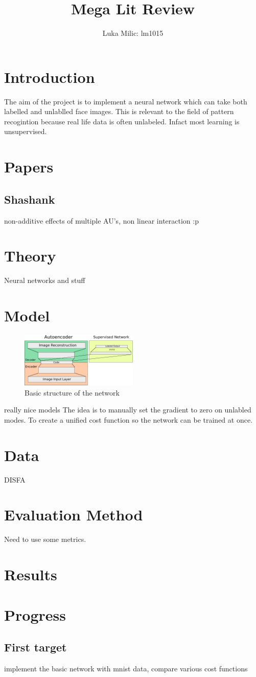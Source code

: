 \documentclass[11pt]{article}
\title{Mega Lit Review}
\author{Luka Milic: lm1015}
\begin{document}
\maketitle
\section{Introduction}
The aim of the project is to implement a neural network which can take both labelled and unlablled face images. \cite{tensorflow2015-whitepaper}
This is relevant to the field of pattern recogintion because real life data is often unlabeled. Infact most learning is unsupervised.
\section{Papers}
\subsection{Shashank}
non-additive effects of multiple AU's, non linear interaction :p
\section{Theory}
Neural networks and stuff\cite{jaiswal_deep_2016}
\section{Model}
\begin{figure}
  \begin{center}
    \includegraphics[width=0.5\textwidth]{illustrations/network_01.pdf}
  \end{center}
  \caption{Basic structure of the network}
\end{figure}
really nice models
The idea is to manually set the gradient to zero on unlabled modes. To create a unified cost function so the network can be trained at once.
\section{Data}
DISFA
\section{Evaluation Method}
Need to use some metrics.
\section{Results}
\section{Progress}
\subsection{First target}
implement the basic network with mnist data, compare various cost functions



\end{document}
